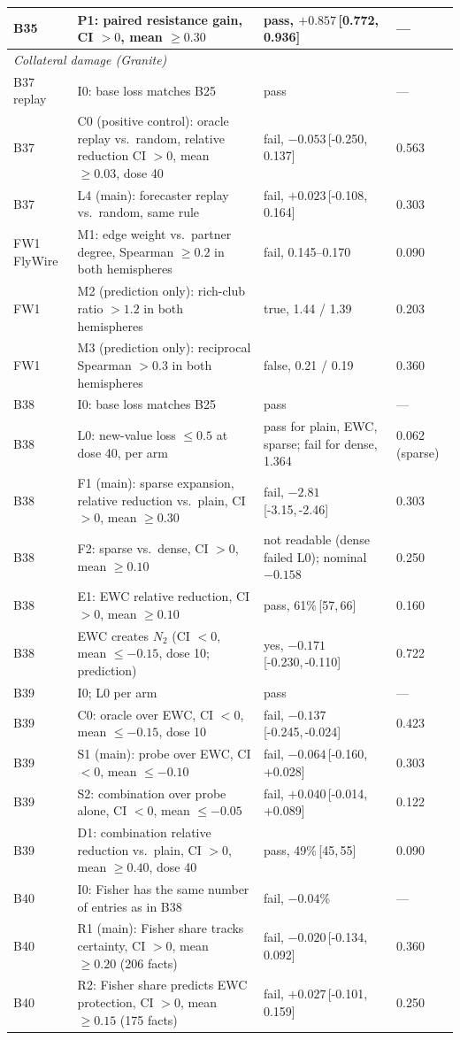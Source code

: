 \documentclass[11pt]{article}
\newcommand{\NTwo}{\ensuremath{N_2}}
\newcommand{\ci}[2]{\,[#1,\,#2]}
\begin{document}
\begin{longtable}{p{2.1cm}p{6.6cm}p{4.6cm}p{1.1cm}}
B35 & P1: paired resistance gain, CI $>0$, mean $\ge0.30$ & pass, $+0.857$\ci{0.772}{0.936} & --- \\
\midrule
\multicolumn{4}{l}{\textit{Collateral damage (Granite)}} \\
B37 replay & I0: base loss matches B25 & pass & --- \\
B37 & C0 (positive control): oracle replay vs.\ random, relative reduction CI $>0$, mean $\ge0.03$, dose 40 & fail, $-0.053$\ci{-0.250}{0.137} & 0.563 \\
B37 & L4 (main): forecaster replay vs.\ random, same rule & fail, $+0.023$\ci{-0.108}{0.164} & 0.303 \\
FW1 FlyWire & M1: edge weight vs.\ partner degree, Spearman $\ge0.2$ in both hemispheres & fail, 0.145--0.170 & 0.090 \\
FW1 & M2 (prediction only): rich-club ratio $>1.2$ in both hemispheres & true, 1.44 / 1.39 & 0.203 \\
FW1 & M3 (prediction only): reciprocal Spearman $>0.3$ in both hemispheres & false, 0.21 / 0.19 & 0.360 \\
B38 & I0: base loss matches B25 & pass & --- \\
B38 & L0: new-value loss $\le0.5$ at dose 40, per arm & pass for plain, EWC, sparse; fail for dense, 1.364 & 0.062 (sparse) \\
B38 & F1 (main): sparse expansion, relative reduction vs.\ plain, CI $>0$, mean $\ge0.30$ & fail, $-2.81$\ci{-3.15}{-2.46} & 0.303 \\
B38 & F2: sparse vs.\ dense, CI $>0$, mean $\ge0.10$ & not readable (dense failed L0); nominal $-0.158$ & 0.250 \\
B38 & E1: EWC relative reduction, CI $>0$, mean $\ge0.10$ & pass, 61\%\ci{57}{66} & 0.160 \\
B38 & EWC creates \NTwo{} (CI $<0$, mean $\le-0.15$, dose 10; prediction) & yes, $-0.171$\ci{-0.230}{-0.110} & 0.722 \\
B39 & I0; L0 per arm & pass & --- \\
B39 & C0: oracle over EWC, CI $<0$, mean $\le-0.15$, dose 10 & fail, $-0.137$\ci{-0.245}{-0.024} & 0.423 \\
B39 & S1 (main): probe over EWC, CI $<0$, mean $\le-0.10$ & fail, $-0.064$\ci{-0.160}{+0.028} & 0.303 \\
B39 & S2: combination over probe alone, CI $<0$, mean $\le-0.05$ & fail, $+0.040$\ci{-0.014}{+0.089} & 0.122 \\
B39 & D1: combination relative reduction vs.\ plain, CI $>0$, mean $\ge0.40$, dose 40 & pass, 49\%\ci{45}{55} & 0.090 \\
B40 & I0: Fisher has the same number of entries as in B38 & fail, $-0.04\%$ & --- \\
B40 & R1 (main): Fisher share tracks certainty, CI $>0$, mean $\ge0.20$ (206 facts) & fail, $-0.020$\ci{-0.134}{0.092} & 0.360 \\
B40 & R2: Fisher share predicts EWC protection, CI $>0$, mean $\ge0.15$ (175 facts) & fail, $+0.027$\ci{-0.101}{0.159} & 0.250 \\
\end{longtable}
\endgroup
\end{document}
